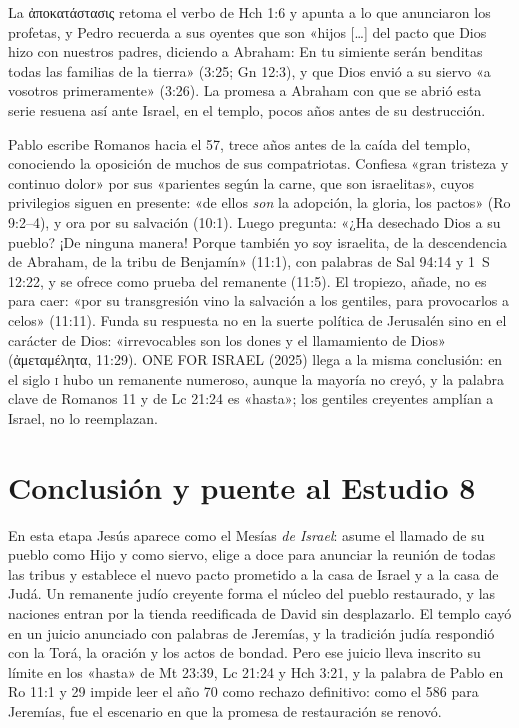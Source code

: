 \documentclass[11pt,letterpaper]{article}
\newcommand{\grc}[1]{\foreignlanguage{ancientgreek}{#1}}
\begin{document}
La \grc{ἀποκατάστασις} retoma el verbo de Hch 1:6 y apunta a lo que anunciaron los profetas, y Pedro recuerda a sus oyentes que son «hijos [\ldots] del pacto que Dios hizo con nuestros padres, diciendo a Abraham: En tu simiente serán benditas todas las familias de la tierra» (3:25; Gn 12:3), y que Dios envió a su siervo «a vosotros primeramente» (3:26). La promesa a Abraham con que se abrió esta serie resuena así ante Israel, en el templo, pocos años antes de su destrucción.

Pablo escribe Romanos hacia el 57, trece años antes de la caída del templo, conociendo la oposición de muchos de sus compatriotas. Confiesa «gran tristeza y continuo dolor» por sus «parientes según la carne, que son israelitas», cuyos privilegios siguen en presente: «de ellos \emph{son} la adopción, la gloria, los pactos» (Ro 9:2--4), y ora por su salvación (10:1). Luego pregunta: «¿Ha desechado Dios a su pueblo? ¡De ninguna manera! Porque también yo soy israelita, de la descendencia de Abraham, de la tribu de Benjamín» (11:1), con palabras de Sal 94:14 y 1~S 12:22, y se ofrece como prueba del remanente (11:5). El tropiezo, añade, no es para caer: «por su transgresión vino la salvación a los gentiles, para provocarlos a celos» (11:11). Funda su respuesta no en la suerte política de Jerusalén sino en el carácter de Dios: «irrevocables son los dones y el llamamiento de Dios» (\grc{ἀμεταμέλητα}, 11:29). ONE FOR ISRAEL (2025) llega a la misma conclusión: en el siglo \textsc{i} hubo un remanente numeroso, aunque la mayoría no creyó, y la palabra clave de Romanos 11 y de Lc 21:24 es «hasta»; los gentiles creyentes amplían a Israel, no lo reemplazan.

\section{Conclusión y puente al Estudio 8}

En esta etapa Jesús aparece como el Mesías \emph{de Israel}: asume el llamado de su pueblo como Hijo y como siervo, elige a doce para anunciar la reunión de todas las tribus y establece el nuevo pacto prometido a la casa de Israel y a la casa de Judá. Un remanente judío creyente forma el núcleo del pueblo restaurado, y las naciones entran por la tienda reedificada de David sin desplazarlo. El templo cayó en un juicio anunciado con palabras de Jeremías, y la tradición judía respondió con la Torá, la oración y los actos de bondad. Pero ese juicio lleva inscrito su límite en los «hasta» de Mt 23:39, Lc 21:24 y Hch 3:21, y la palabra de Pablo en Ro 11:1 y 29 impide leer el año 70 como rechazo definitivo: como el 586 para Jeremías, fue el escenario en que la promesa de restauración se renovó.
\end{document}
